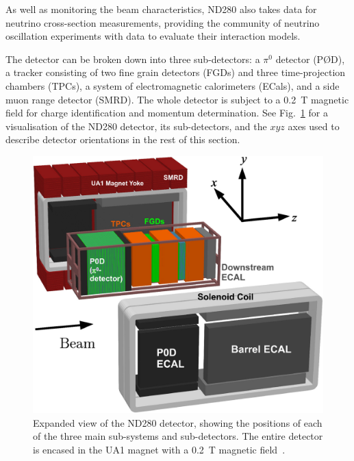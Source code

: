 \documentclass[aps,pra,12pt,notitlepage,tightenlines]{revtex4-1}
\begin{document}
As well as monitoring the beam characteristics, ND280 also takes data for neutrino cross-section measurements, providing the community of neutrino oscillation experiments with data to evaluate their interaction models. 

The detector can be broken down into three sub-detectors: a $\pi^0$ detector (P\O D), a tracker consisting of two fine grain detectors (FGDs) and three time-projection chambers (TPCs), a system of electromagnetic calorimeters (ECals), and a side muon range detector (SMRD). The whole detector is subject to a 0.2~T magnetic field for charge identification and momentum determination. See Fig.~\ref{fig:ND} for a visualisation of the ND280 detector, its sub-detectors, and the $xyz$ axes used to describe detector orientations in the rest of this section.
\begin{figure}
 \includegraphics[scale=1]{ND280.png}
 \caption{Expanded view of the ND280 detector, showing the positions of each of the three main sub-systems and sub-detectors. The entire detector is encased in the UA1 magnet with a 0.2~T magnetic field~\cite{ABE2011106}.}
 \label{fig:ND}
\end{figure}
\end{document}
